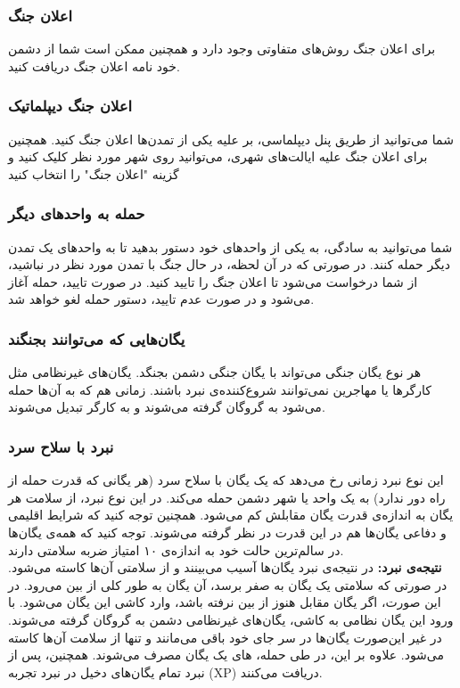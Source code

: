 \documentclass[]{article}
\begin{document}
\subsubsection*{{\titr اعلان جنگ}}
برای اعلان جنگ روش‌های متفاوتی وجود دارد و همچنین ممکن است شما از دشمن خود نامه اعلان جنگ دریافت کنید.
\subsubsection*{{\titr اعلان جنگ دیپلماتیک}}
شما می‌توانید از طریق پنل دیپلماسی، بر علیه یکی از تمدن‌ها اعلان جنگ کنید. همچنین برای اعلان جنگ علیه ایالت‌های شهری، می‌توانید روی شهر مورد نظر کلیک کنید و گزینه "اعلان جنگ" را انتخاب کنید
\subsubsection*{{\titr حمله به واحد‌های دیگر}}
شما می‌توانید به سادگی، به یکی از واحد‌های خود دستور بدهید تا به واحد‌های یک تمدن دیگر حمله کنند. در صورتی که در آن لحظه، در حال جنگ با تمدن مورد نظر در نباشید، از شما درخواست می‌شود تا اعلان جنگ را تایید کنید. در صورت تایید، حمله آغاز می‌شود و در صورت عدم تایید، دستور حمله لغو خواهد شد.
\subsubsection*{{\titr یگان‌هایی که می‌توانند بجنگند}}
هر نوع یگان جنگی می‌تواند با یگان جنگی دشمن بجنگد. یگان‌های غیرنظامی مثل کارگرها یا مهاجرین نمی‌توانند شروع‌کننده‌ی نبرد باشند. زمانی هم که به آن‌ها حمله می‌شود به گروگان گرفته می‌شوند و به کارگر تبدیل می‌شوند. 
\subsubsection*{{\titr نبرد با سلاح سرد}}
این نوع نبرد زمانی رخ می‌دهد که یک یگان با سلاح سرد (هر یگانی که قدرت حمله از راه دور ندارد) به یک واحد یا شهر دشمن حمله می‌کند. در این نوع نبرد، از سلامت هر یگان به اندازه‌ی قدرت یگان مقابلش کم می‌شود. همچنین توجه کنید که شرایط اقلیمی و دفاعی یگان‌ها هم در این قدرت در نظر گرفته می‌شوند. توجه کنید که همه‌ی یگان‌ها در سالم‌ترین حالت خود به اندازه‌ی ۱۰ امتیاز ضربه سلامتی دارند.\\
\textbf{نتیجه‌ی نبرد:}
در نتیجه‌ی نبرد یگان‌ها آسیب می‌بینند و از سلامتی آن‌ها کاسته می‌شود. در صورتی که سلامتی یک یگان به صفر برسد، آن یگان به طور کلی از بین می‌رود. در این صورت، اگر یگان مقابل هنوز از بین نرفته باشد، وارد کاشی این یگان می‌شود. با ورود این یگان نظامی به کاشی، یگان‌های غیرنظامی دشمن به گروگان گرفته می‌شوند. در غیر این‌صورت یگان‌ها در سر جای خود باقی می‌مانند و تنها از سلامت آن‌ها کاسته می‌شود.
علاوه بر این، در طی حمله، های یک یگان مصرف می‌شوند. همچنین، پس از نبرد تمام یگان‌های دخیل در نبرد تجربه (XP) دریافت می‌کنند.
\end{document}

